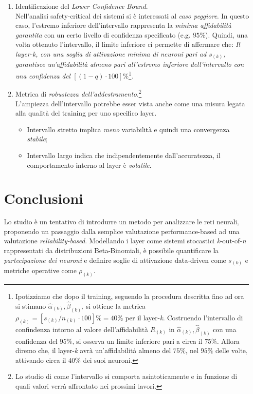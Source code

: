 \documentclass[10pt]{article} %
\begin{document}
\begin{enumerate}
    \item Identificazione del \textit{Lower Confidence Bound}. \\
    Nell'analisi safety-critical dei sistemi si è interessati al \textit{caso peggiore}. In questo caso, l'estremo inferiore dell'intervallo rappresenta la \textit{minima affidabilità garantita} con un certo livello di confidenza specificato (e.g. $95\%$). Quindi, una volta ottenuto l'intervallo, il limite inferiore ci permette di affermare che: \textit{Il layer-k, con una soglia di attivazione minima di neuroni pari ad $s_{(k)}$, garantisce un'affidabilità almeno pari all'estremo inferiore dell'intervallo con una confidenza del $[(1-q)\cdot100]\%$}\footnote{Ipotizziamo che dopo il training, seguendo la procedura descritta fino ad ora si stimano $\hat{\alpha}_{(k)}, \hat{\beta}_{(k)}$, si ottiene la metrica $\rho_{(k)} = [s_{(k)}/{n_{(k)}}\cdot100]\% = 40\%$ per il layer-\textit{k}. Costruendo l'intervallo di confindenza intorno al valore dell'affidabilità $R_{(k)}$ in $\hat{\alpha}_{(k)}, \hat{\beta}_{(k)}$ con una confidenza del $95\%$, si osserva un limite inferiore pari a circa il $75\%$. Allora diremo che, il layer-\textit{k} avrà un'affidabilità almeno del $75\%$, nel $95\%$ delle volte, attivando circa il $40\%$ dei suoi neuroni.}.
    
    \item Metrica di \textit{robustezza dell'addestramento}.\footnote{Lo studio di come l'intervallo si comporta asintoticamente e in funzione di quali valori verrà affrontato nei prossimi lavori.}\\
    L'ampiezza dell'intervallo potrebbe esser vista anche come una misura legata alla qualità del training per uno specifico layer.
    \begin{itemize}
        \item Intervallo stretto implica \textit{meno} variabilità e quindi una convergenza \textit{stabile};
        \item Intervallo largo indica che indipendentemente dall'accuratezza, il comportamento interno al layer è \textit{volatile}.
    \end{itemize}
\end{enumerate}

\section{Conclusioni}
Lo studio è un tentativo di introdurre un metodo per analizzare le reti neurali, proponendo un passaggio dalla semplice valutazione performance-based ad una valutazione \textit{reliability-based}. Modellando i layer come sistemi stocastici \textit{k}-out-of-\textit{n} rappresentati da distribuzioni Beta-Binomiali, è possibile quantificare la \textit{partecipazione dei neuroni} e definire soglie di attivazione data-driven come $s_{(k)}$ e metriche operative come $\rho_{(k)}$.
\end{document}
